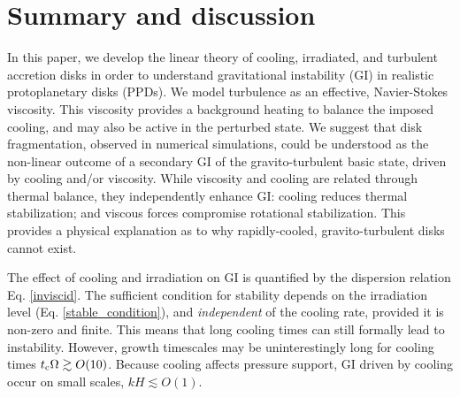 \section{Summary and discussion}\label{summary}
In this paper, we develop the linear theory of cooling, irradiated,
and turbulent accretion disks in order to understand gravitational
instability (GI) in realistic protoplanetary disks (PPDs). 
We model turbulence as an effective, 
Navier-Stokes viscosity. This viscosity provides a 
background heating to balance the imposed cooling,  
and may also be active in the perturbed state.  
We suggest that disk fragmentation, observed in numerical simulations,
could be understood as the non-linear outcome of a secondary GI of the
gravito-turbulent basic state, driven by cooling and/or viscosity.   
While viscosity and cooling are related through thermal
balance, they independently enhance GI: cooling reduces thermal
stabilization; and viscous forces compromise rotational
stabilization. This provides a physical explanation as to why
rapidly-cooled, gravito-turbulent disks cannot exist. 


The effect of cooling and irradiation on GI is quantified by the
dispersion relation 
Eq. \ref{inviscid}. The sufficient condition for stability 
depends on the irradiation level (Eq. \ref{stable_condition}), and 
\emph{independent} of the cooling rate, provided it is non-zero and
finite. This means that long cooling times can still  
formally lead to instability. However, growth timescales may be 
uninterestingly long for cooling times $t_\mathrm{c}\Omega\gtrsim
O(10)$. Because cooling affects pressure support, GI driven by cooling
occur on small scales, $kH\lesssim O(1)$.   


